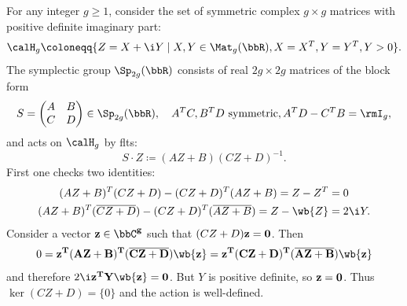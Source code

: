 \begin{example}\label{ex siegel upper half-space}
    For any integer $g\geq 1$, consider the set of symmetric complex $g\times g$ matrices with positive definite imaginary part:
    \[\calH_g \coloneqq \{Z=X+\i Y\mid X,Y\in \Mat_g(\bbR), X=X^T, Y=Y^T, Y>0\}.\]
    The symplectic group $\Sp_{2g}(\bbR)$ consists of real $2g\times 2g$ matrices of the block form 
    \[S=\begin{pmatrix}
        A & B\\
        C & D
    \end{pmatrix}\in\Sp_{2g}(\bbR),\quad A^T C,B^TD\text{ symmetric}, A^TD-C^TB=\rmI_g,\]
    and acts on $\calH_g$ by \glspl{flt}:
    \[S\cdot Z\coloneqq (AZ+B)(CZ+D)^{-1}.\]
    First one checks two identities:
    \begin{align}
        (AZ+B)^T (CZ+D)-(CZ+D)^T(AZ+B)=Z-Z^T&=0\label{1y94}\\
        (AZ+B)^T (\overline{CZ+D})-(CZ+D)^T(\overline{AZ+B})=Z-\wb{Z}&=2\i Y.\label{13702}
    \end{align}
    Consider a vector $\bf{z}\in\bbC^g$ such that $(CZ+D)\bf{z}=0$. Then 
    \[0=\bf{z}^T (AZ+B)^T(\overline{CZ+D})\wb{\bf{z}}=\bf{z}^T (CZ+D)^T(\overline{AZ+B})\wb{\bf{z}}\]
    and therefore $2\i \bf{z}^T Y \wb{\bf{z}}=0$. But $Y$ is positive definite, so $\bf{z}=0$. Thus $\ker(CZ+D)=\{0\}$ and the action is well-defined.


\end{example}
